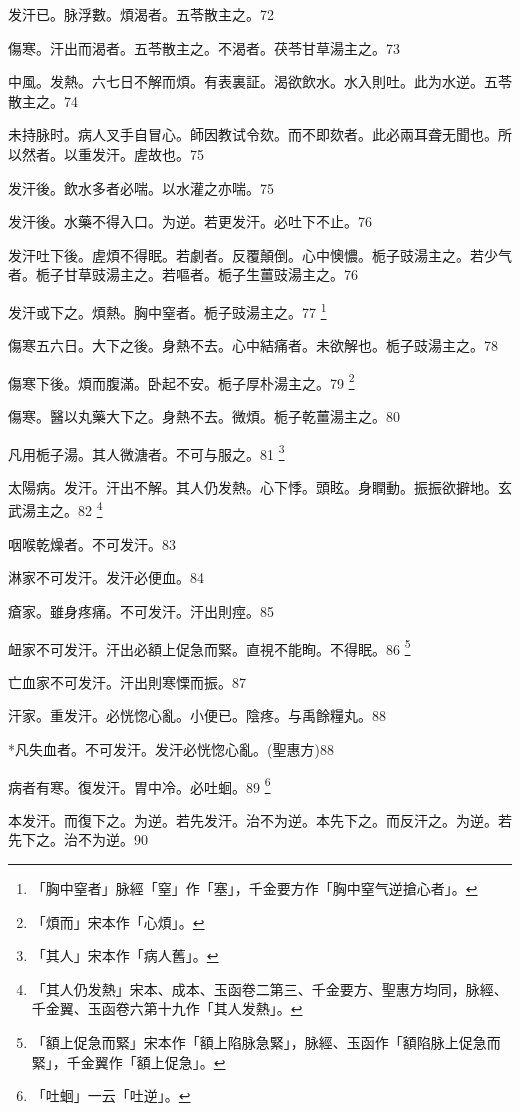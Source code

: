 \documentclass[b5paper,twoside,zihao=-4,UTF8]{ctexbook}
\begin{document}
发汗已。脉浮數。煩渴者。五苓散主之。72

傷寒。汗出而渴者。五苓散主之。不渴者。茯苓甘草湯主之。73

中風。发熱。六七日不解而煩。有表裏証。渴欲飲水。水入則吐。此为水逆。五苓散主之。74

未持脉时。病人叉手自冒心。師因教试令欬。而不即欬者。此必兩耳聋无聞也。所以然者。以重发汗。虗故也。75

发汗後。飲水多者必喘。以水灌之亦喘。75

发汗後。水藥不得入口。为逆。{若更发汗。必吐下不止。}76

发汗吐下後。虗煩不得眠。若劇者。反覆顛倒。心中懊憹。栀子{豉}湯主之。若少气者。栀子甘草{豉}湯主之。若嘔者。栀子生薑{豉}湯主之。76

发汗或下之。煩熱。胸中窒者。栀子{豉}湯主之。77
	\footnote{「胸中窒者」脉經「窒」作「塞」，千金要方作「胸中窒气逆搶心者」。}

傷寒五六日。大下之後。身熱不去。心中結痛者。未欲解也。栀子{豉}湯主之。78

傷寒下後。煩而腹滿。卧起不安。栀子厚朴湯主之。79
	\footnote{「煩而」宋本作「心煩」。}

傷寒。醫以丸藥大下之。身熱不去。微煩。栀子乾薑湯主之。80

凡用栀子湯。其人微溏者。不可与服之。81
	\footnote{「其人」宋本作「病人舊」。}

太陽病。发汗。汗出不解。其人仍发熱。心下悸。頭眩。身瞤動。振振欲擗地。玄武湯主之。82
	\footnote{「其人仍发熱」宋本、成本、玉函卷二第三、千金要方、聖惠方均同，脉經、千金翼、玉函卷六第十九作「其人发熱」。}

咽喉乾燥者。不可发汗。83

淋家不可发汗。发汗必便血。84

瘡家。雖身疼痛。不可发汗。汗出則痙。85

衄家不可发汗。汗出必額上促急{而緊}。直視不能眴。不得眠。86
	\footnote{「額上促急而緊」宋本作「額上陷脉急緊」，脉經、玉函作「額陷脉上促急而緊」，千金翼作「額上促急」。}

亡血家不可发汗。汗出則寒慄而振。87

汗家。重发汗。必恍惚心亂。小便已。陰疼。与禹餘糧丸。88

*凡失血者。不可发汗。发汗必恍惚心亂。(聖惠方)88

病者有寒。復发汗。胃中冷。必吐蛔。89
	\footnote{「吐蛔」一云「吐逆」。}

本发汗。而復下之。为逆。若先发汗。治不为逆。本先下之。而反汗之。为逆。若先下之。治不为逆。90
\end{document}
